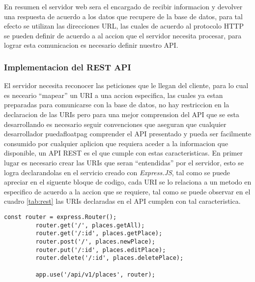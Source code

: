 En resumen el servidor web sera el encargado de recibir informacion y devolver una respuesta de acuerdo a los datos que recupere de la base de datos, para tal efecto se utilizan las direcciones URL, las cuales de acuerdo al protocolo HTTP se pueden definir de acuerdo a al accion que el servidor necesita procesar, para lograr esta comunicacion es necesario definir nuestro API.\\


\subsubsection{Implementacion del REST API}
\label{subs:Implementacion del REST API}



 El servidor necesita reconocer las peticiones que le llegan del cliente, para lo cual es neceario ``mapear'' un URI a una accion especifica, las cuales ya estan preparadas para comunicarse con la base de datos, no hay restriccion en la declaracion de las URIs pero para una mejor comprension del API que se esta desarrollando es necesario seguir convenciones que aseguran que cualquier desarrollador puedafloatpag comprender el API presentado y pueda ser facilmente consumido por cualquier aplicion que requiera aceder a la informacion que disponible, un API REST es el que cumple con estas caracteristicas.
 En primer lugar es necesario crear las URIs que seran ``entendidas'' por el servidor, esto se logra declarandolas en el servicio creado con \emph{Express.JS}, tal como se puede apreciar en el siguente bloque de codigo, cada URI se lo relaciona a un metodo en especifico de acuerdo a la accion que se requiere, tal como se puede observar en el cuadro \ref{tab:rest} las URIs declaradas en el API cumplen con tal caracteristica.\\


 \begin{center}
   \begin{lstlisting}[label=express_api,caption=Declarando API REST con ExpressJS]
         const router = express.Router();
         router.get('/', places.getAll);
         router.get('/:id', places.getPlace);
         router.post('/', places.newPlace);
         router.put('/:id', places.editPlace);
         router.delete('/:id', places.deletePlace);

         app.use('/api/v1/places', router);
   \end{lstlisting}
 \end{center}

